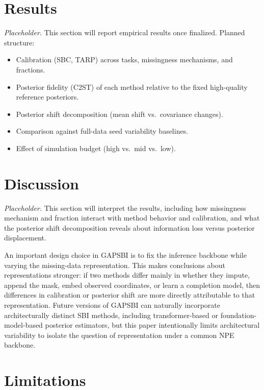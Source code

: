 \documentclass{article} %
\begin{document}
\section{Results}
\label{sec:results}

\textit{Placeholder.} This section will report empirical results once finalized.
Planned structure:
\begin{itemize}
  \item Calibration (SBC, TARP) across tasks, missingness mechanisms, and
  fractions.
  \item Posterior fidelity (C2ST) of each method relative to the fixed
  high-quality reference posteriors.
  \item Posterior shift decomposition (mean shift vs.\ covariance changes).
  \item Comparison against full-data seed variability baselines.
  \item Effect of simulation budget (high vs.\ mid vs.\ low).
\end{itemize}

\section{Discussion}
\label{sec:discussion}

\textit{Placeholder.} This section will interpret the results, including how
missingness mechanism and fraction interact with method behavior and calibration,
and what the posterior shift decomposition reveals about information loss versus
posterior displacement.

An important design choice in GAPSBI is to fix the inference backbone while
varying the missing-data representation. This makes conclusions about
representations stronger: if two methods differ mainly in whether they impute,
append the mask, embed observed coordinates, or learn a completion model, then
differences in calibration or posterior shift are more directly attributable to
that representation. Future versions of GAPSBI can naturally incorporate
architecturally distinct SBI methods, including transformer-based or
foundation-model-based posterior estimators, but this paper intentionally limits
architectural variability to isolate the question of representation under a
common NPE backbone.

\section{Limitations}
\label{sec:limitations}
\end{document}
